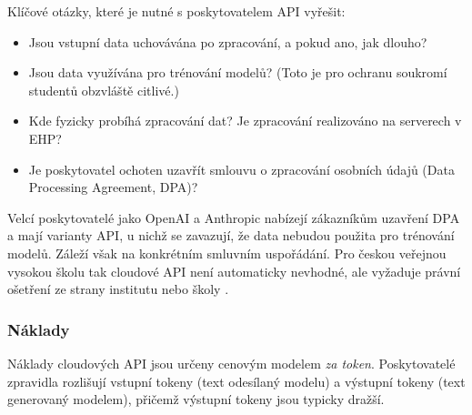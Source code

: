 Klíčové otázky, které je nutné s poskytovatelem API vyřešit:
\begin{itemize}
    \item Jsou vstupní data uchovávána po zpracování, a pokud ano, jak dlouho?
    \item Jsou data využívána pro trénování modelů? (Toto je pro ochranu soukromí studentů obzvláště citlivé.)
    \item Kde fyzicky probíhá zpracování dat? Je zpracování realizováno na serverech v EHP?
    \item Je poskytovatel ochoten uzavřít smlouvu o zpracování osobních údajů (Data Processing Agreement, DPA)?
\end{itemize}

Velcí poskytovatelé jako OpenAI a Anthropic nabízejí zákazníkům uzavření DPA a mají varianty API, u nichž se zavazují, že data nebudou použita pro trénování modelů.
Záleží však na konkrétním smluvním uspořádání.
Pro českou veřejnou vysokou školu tak cloudové API není automaticky nevhodné, ale vyžaduje právní ošetření ze strany institutu nebo školy \cite{gdpr2016}.

\subsubsection*{Náklady}

Náklady cloudových API jsou určeny cenovým modelem \emph{za token}.
Poskytovatelé zpravidla rozlišují vstupní tokeny (text odesílaný modelu) a výstupní tokeny (text generovaný modelem), přičemž výstupní tokeny jsou typicky dražší.


